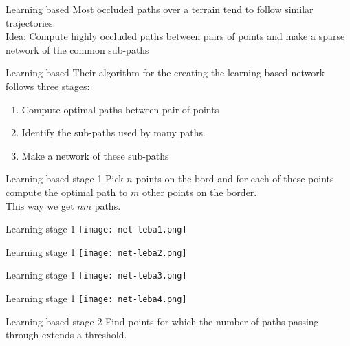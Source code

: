
\begin{frame}{Learning based}
	Most occluded paths over a terrain tend to follow similar trajectories.  \\
	Idea: Compute highly occluded paths between pairs of points and make a sparse network of the common sub-paths
	
\end{frame}

\begin{frame}{Learning based}
	Their algorithm for the creating the learning based network follows three stages: 
	\begin{enumerate}
		\item Compute optimal paths between pair of points
		\item Identify the sub-paths used by many paths. 
		\item Make a network of these sub-paths
	\end{enumerate}
	
\end{frame}

\begin{frame}{Learning based stage 1}
		Pick $n$ points on the bord and for each of these points compute the optimal path to $m$ other points on the border. \\
		This way we get $nm$ paths. 
\end{frame}


\begin{frame}{Learning stage 1}
	\centering
	\texttt{[image: net-leba1.png]}
\end{frame}

\begin{frame}{Learning stage 1}
	\centering
	\texttt{[image: net-leba2.png]}
\end{frame}

\begin{frame}{Learning stage 1}
	\centering
	\texttt{[image: net-leba3.png]}
\end{frame}

\begin{frame}{Learning stage 1}
	\centering
	\texttt{[image: net-leba4.png]}
\end{frame}

\begin{frame}{Learning based stage 2}
		Find points for which the number of paths passing through extends a threshold. 
\end{frame}

